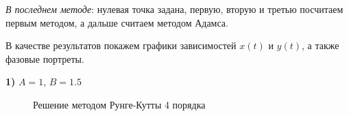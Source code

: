 		\textit{В последнем методе}: нулевая точка задана, первую, вторую и третью посчитаем первым методом, а дальше считаем методом Адамса.
		
		
		В качестве результатов покажем графики зависимостей $x(t)$ и $y(t)$, а также фазовые портреты.
		
		

		\newpage
		\thispagestyle{empty}
		\begin{landscape}
		\textbf{1)} $A = 1$, $B = 1.5$	
		\begin{figure}[h!]
			\begin{minipage}[h]{0.55\linewidth}
			\end{minipage}
			\hfill
			\begin{minipage}[h]{0.55\linewidth}
			\end{minipage}
			\caption{Решение методом Рунге-Кутты 4 порядка}
		\end{figure}
		\fillandplacepagenumber
		\end{landscape}
	
